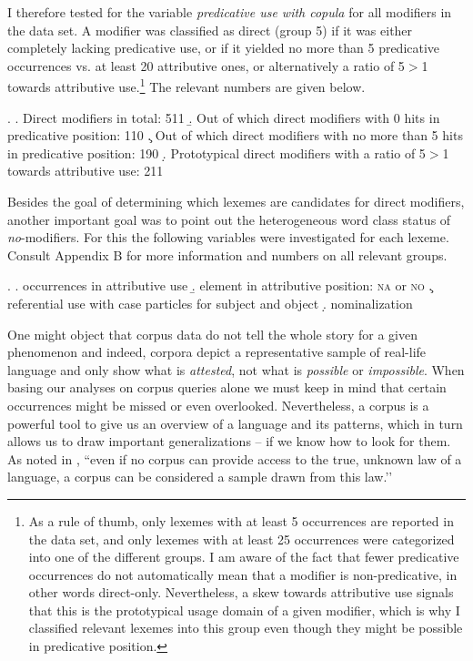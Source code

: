 \documentclass [output=book,colorlinks,citecolor=brown]{langscibook}
\begin{document}
I therefore tested for the variable \textit{predicative use with copula} for all modifiers in the data set. A modifier was classified as direct (group 5) if it was either completely lacking predicative use, or if it yielded no more than 5 predicative occurrences vs. at least 20 attributive ones, or alternatively a ratio of 5$>$1 towards attributive use.\footnote{As a rule of thumb, only lexemes with at least 5 occurrences are reported in the data set, and only lexemes with at least 25 occurrences were categorized into one of the different groups. I am aware of the fact that fewer predicative occurrences do not automatically mean that a modifier is non-predicative, in other words direct-only. Nevertheless, a skew towards attributive use signals that this is the prototypical usage domain of a given modifier, which is why I classified relevant lexemes into this group even though they might be possible in predicative position.} The relevant numbers are given below.

\ex. \a. Direct modifiers in total: 511
\b. Out of which direct modifiers with 0 hits in predicative position: 110
\c. Out of which direct modifiers with no more than 5 hits in predicative position: 190
\d. Prototypical direct modifiers with a ratio of 5$>$1 towards attributive use: 211

Besides the goal of determining which lexemes are candidates for direct modifiers, another important goal was to point out the heterogeneous word class status of \textit{no}-modifiers. For this the following variables were investigated for each lexeme. Consult Appendix B for more information and numbers on all relevant groups.

\ex. \a. occurrences in attributive use
\b. element in attributive position: \textsc{na} or \textsc{no}
\c. referential use with case particles for subject and object
\d. nominalization

One might object that corpus data do not tell the whole story for a given phenomenon and indeed, corpora depict a representative sample of real-life language and only show what is \textit{attested}, not what is \textit{possible} or \textit{impossible}. When basing our analyses on corpus queries alone we must keep in mind that certain occurrences might be missed or even overlooked. Nevertheless, a corpus is a powerful tool to give us an overview of a language and its patterns, which in turn allows us to draw important generalizations -- if we know how to look for them. As noted in \citet[7]{desagulier:2017:corpus}, ``even if no corpus can provide access to the true, unknown law of a language, a corpus can be considered a sample drawn from this law.’’
\end{document}
